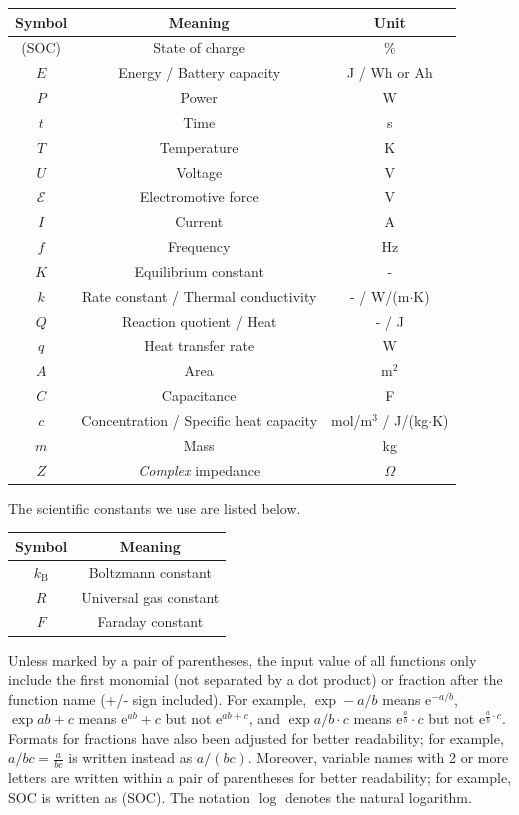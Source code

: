 \documentclass[12pt]{article}
\begin{document}
\begin{center}
\begin{tabular}{c|cc}
	\hline
	Symbol & Meaning & Unit \\
	\hline
	(SOC) & State of charge & \% \\
	$E$ & Energy / Battery capacity & J / Wh or Ah \\
	$P$ & Power & W \\
	$t$ & Time & s \\
	$T$ & Temperature & K \\
	$U$ & Voltage & V \\
	$\mathcal E$ & Electromotive force & V \\
	$I$ & Current & A \\
	$f$ & Frequency & Hz \\
	$K$ & Equilibrium constant & - \\
	$k$ & Rate constant / Thermal conductivity & - / W/(m$\cdot$K) \\
	$Q$ & Reaction quotient / Heat & - / J \\
	$q$ & Heat transfer rate & W \\
	$A$ & Area & m$^2$ \\
	$C$ & Capacitance & F \\
	$c$ & Concentration / Specific heat capacity & mol/m$^3$ / J/(kg$\cdot$K) \\
	$m$ & Mass & kg \\
	$Z$ & \textit{Complex} impedance & $\Omega$ \\
	\hline
\end{tabular}
\end{center}

The scientific constants we use are listed below.

\begin{center}
\begin{tabular}{c|c}
	\hline
	Symbol & Meaning \\
	\hline
	$k_\mathrm B$ & Boltzmann constant \\
	$R$ & Universal gas constant \\
	$F$ & Faraday constant \\
	\hline
\end{tabular}
\end{center}

Unless marked by a pair of parentheses, the input value of all functions only include the first monomial (not separated by a dot product) or fraction after the function name (+/- sign included). For example, $\exp -a/b$ means $\mathrm e^{-a/b}$, $\exp ab+c$ means $\mathrm e^{ab}+c$ but not $\mathrm e^{ab+c}$, and $\exp a/b\cdot c$ means $\mathrm e^{\frac{a}{b}}\cdot c$ but not $\mathrm e^{\frac{a}{b}\cdot c}$. Formats for fractions have also been adjusted for better readability; for example, $a/bc=\frac{a}{bc}$ is written instead as $a/(bc)$. Moreover, variable names with 2 or more letters are written within a pair of parentheses for better readability; for example, SOC is written as (SOC). The notation $\log$ denotes the natural logarithm.
\end{document}
